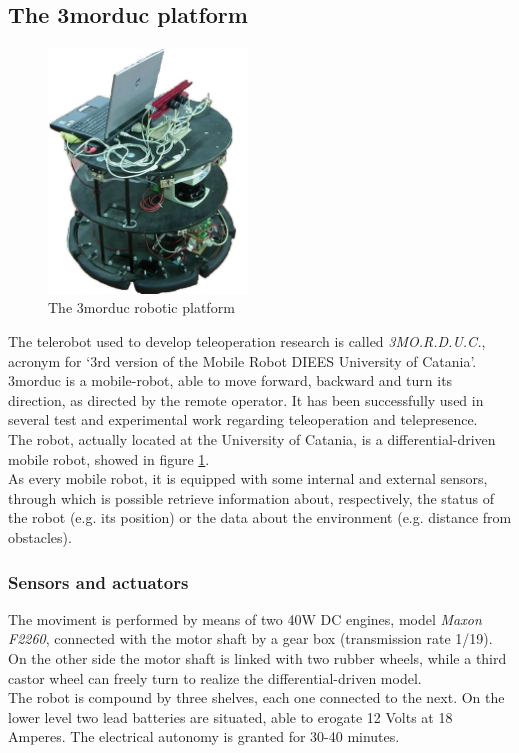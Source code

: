 \subsection{The 3morduc platform}
\label{sec:3morduc}

\begin{figure} [h]
  \begin{center}
    \includegraphics[width=150pt]{img/3morduc.jpg}
    \caption{The 3morduc robotic platform}
    \label{fig:morduc}
  \end{center}
\end{figure}

The telerobot used to develop teleoperation research is
called \textit{3MO.R.D.U.C.}, acronym for `3rd version of
the Mobile Robot DIEES University of Catania'.
3morduc is a mobile-robot, able to move forward, backward
and turn its direction, as directed by the remote operator.
It has been successfully used in several test and experimental
work regarding teleoperation and telepresence.
\\
The robot, actually located at the University of
Catania, is a differential-driven mobile robot, showed
in figure \ref{fig:morduc}.
\\
As every mobile robot, it is equipped with some internal
and external sensors, through which is possible retrieve
information about, respectively, the status of the robot
(e.g. its position) or the data about the environment (e.g.
distance from obstacles).

\subsubsection{Sensors and actuators}
\label{sec:3morduc:sensors_actuators}


The moviment is performed by means of two 40W DC engines, model
\textit{Maxon F2260}, connected with the motor shaft by a gear
box (transmission rate 1/19). On the other side the motor shaft
is linked with two rubber wheels, while a third castor wheel can
freely turn to realize the differential-driven model.
\\
The robot is compound by three shelves, each one connected to
the next. On the lower level two lead batteries are situated,
able to erogate 12 Volts at 18 Amperes. The electrical autonomy is
granted for 30-40 minutes.

